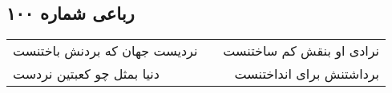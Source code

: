 \begin{center}
\section*{رباعی شماره ۱۰۰}
\label{sec:sh100}
\begin{longtable}{l p{0.5cm} r}
نردیست جهان که بردنش باختنست
&&
نرادی او بنقش کم ساختنست
\\
دنیا بمثل چو کعبتین نردست
&&
برداشتنش برای انداختنست
\\
\end{longtable}
\end{center}
